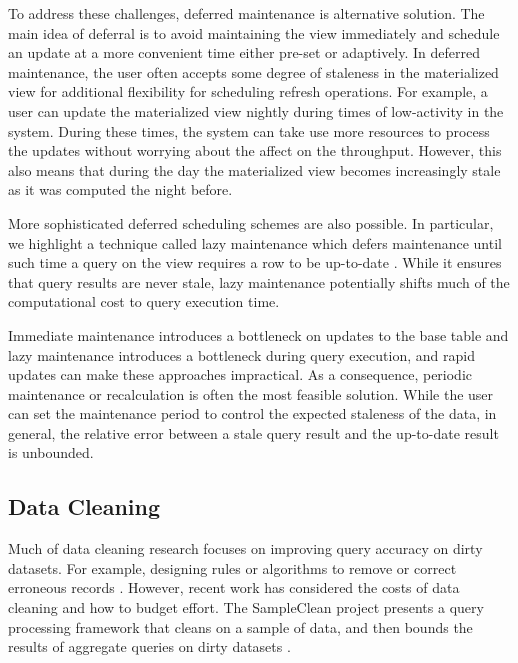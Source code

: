 To address these challenges, deferred maintenance is alternative solution.
The main idea of deferral is to avoid maintaining the view immediately and schedule an update at a more convenient time either pre-set or adaptively.
In deferred maintenance, the user often accepts some degree of staleness in 
the materialized view for additional flexibility for scheduling refresh operations.
For example, a user can update the materialized view nightly during times of low-activity in the system.
During these times, the system can take use more resources to process the updates without worrying about the affect on the throughput.
However, this also means that during the day the materialized view becomes increasingly stale as it was computed the night before.

More sophisticated deferred scheduling schemes are also possible.
In particular, we highlight a technique called lazy maintenance which defers maintenance until such time
a query on the view requires a row to be up-to-date \cite{zhou2007lazy}.
While it ensures that query results are never stale, lazy maintenance potentially shifts much of the computational cost to query execution time.

Immediate maintenance introduces a bottleneck on updates to the base table and lazy maintenance introduces a bottleneck during query execution,
and rapid updates can make these approaches impractical.
As a consequence, periodic maintenance or recalculation is often the most feasible solution.
While the user can set the maintenance period to control the expected staleness of the data, in general, the relative error between a stale query result and the up-to-date result is unbounded.

\subsection{Data Cleaning}
Much of data cleaning research focuses on improving query accuracy on dirty datasets.
For example, designing rules or algorithms to remove or correct erroneous records \cite{rahm2000data}.
However, recent work has considered the costs of data cleaning and how to budget effort.
The SampleClean project presents a query processing framework that cleans on a sample of data, and then bounds the results of aggregate queries on dirty datasets \cite{wang1999sample}.

